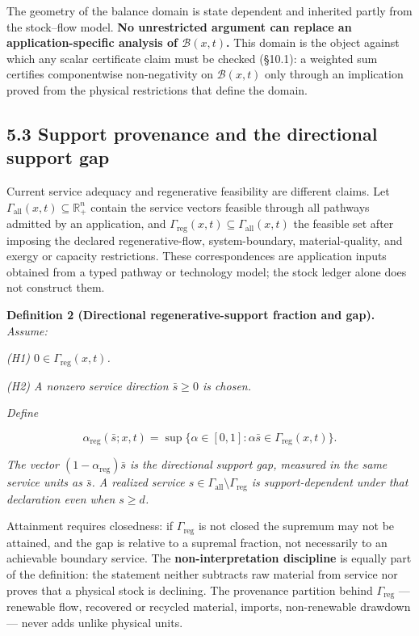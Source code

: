 \documentclass[11pt]{article}
\begin{document}
The geometry of the balance domain is state dependent and inherited partly from the stock--flow model. \textbf{No unrestricted argument can replace an application-specific analysis of \(\mathcal B(x,t)\).} This domain is the object against which any scalar certificate claim must be checked (\S10.1): a weighted sum certifies componentwise non-negativity on \(\mathcal B(x,t)\) only through an implication proved from the physical restrictions that define the domain.

\subsection*{5.3 Support provenance and the directional support gap}\label{53-support-provenance-and-the-directional-support-gap}

Current service adequacy and regenerative feasibility are different claims. Let \(\Gamma_{\mathrm{all}}(x,\allowbreak{}t) \subseteq \mathbb{R}^n_+\allowbreak{}\) contain the service vectors feasible through all pathways admitted by an application, and \(\Gamma_{\mathrm{reg}}(x,\allowbreak{}t) \subseteq \Gamma_{\mathrm{all}}(x,\allowbreak{}t)\) the feasible set after imposing the declared regenerative-flow, system-boundary, material-quality, and exergy or capacity restrictions. These correspondences are application inputs obtained from a typed pathway or technology model; the stock ledger alone does not construct them.

\textbf{Definition 2 (Directional regenerative-support fraction and gap).} \emph{Assume:}

\emph{(H1) \(0 \in \Gamma_{\mathrm{reg}}(x,t)\).}

\emph{(H2) A nonzero service direction \(\bar s \ge 0\) is chosen.}

\emph{Define} 

$$\alpha_{\mathrm{reg}}(\bar s; x, t) = \sup\{ \alpha \in [0,1] : \alpha \bar s \in \Gamma_{\mathrm{reg}}(x,t) \}.$$

 \emph{The vector \((1 - \alpha_{\mathrm{reg}})\bar s\) is the directional support gap, measured in the same service units as \(\bar s\). A realized service \(s \in \Gamma_{\mathrm{all}} \setminus \Gamma_{\mathrm{reg}}\) is support-dependent under that declaration even when \(s \ge d\).}

Attainment requires closedness: if \(\Gamma_{\mathrm{reg}}\) is not closed the supremum may not be attained, and the gap is relative to a supremal fraction, not necessarily to an achievable boundary service. The \textbf{non-interpretation discipline} is equally part of the definition: the statement neither subtracts raw material from service nor proves that a physical stock is declining. The provenance partition behind \(\Gamma_{\mathrm{reg}}\) --- renewable flow, recovered or recycled material, imports, non-renewable drawdown --- never adds unlike physical units.
\end{document}
